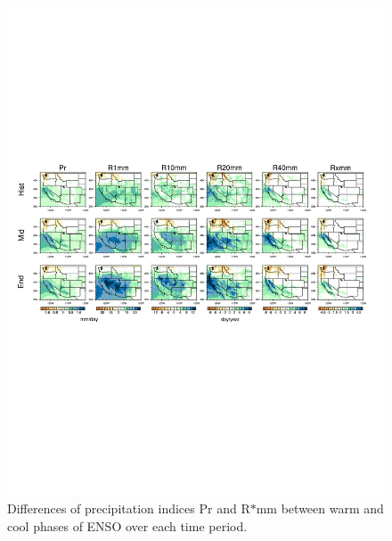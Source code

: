 \documentclass{ametsoc}
\begin{document}
\begin{figure}
\begin{center}
\includegraphics[width=8in, trim={0.6cm 9.5cm 1.0cm 9.0cm},clip]{wd_index_enso_wetSeason.pdf}
\caption{Differences of precipitation indices Pr and R$\ast$mm between warm and cool phases of ENSO over each time period.}
\label{fig:difEnso}
\end{center}
\end{figure}
\end{document}
